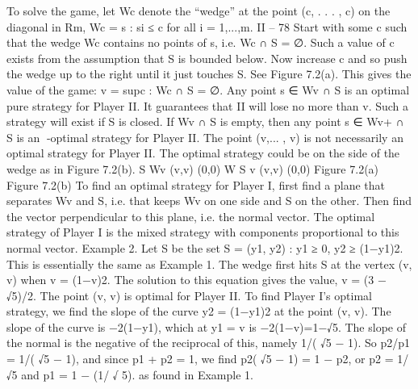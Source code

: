 \documentclass[]{report}
\begin{document}
To solve the game, let Wc denote the “wedge” at the point (c, . . . , c) on the diagonal
in Rm,
Wc = {s : si ≤ c for all i = 1,...,m}.
II – 78
Start with some c such that the wedge Wc contains no points of s, i.e. Wc ∩ S = ∅. Such
a value of c exists from the assumption that S is bounded below. Now increase c and so
push the wedge up to the right until it just touches S. See Figure 7.2(a). This gives the
value of the game:
v = sup{c : Wc ∩ S = ∅}.
Any point s ∈ Wv ∩ S is an optimal pure strategy for Player II. It guarantees that II will
lose no more than v. Such a strategy will exist if S is closed. If Wv ∩ S is empty, then
any point s ∈ Wv+ ∩ S is an -optimal strategy for Player II. The point (v,... , v) is not
necessarily an optimal strategy for Player II. The optimal strategy could be on the side of
the wedge as in Figure 7.2(b).
S
Wv
(v,v)
(0,0)
W S v
(v,v)
(0,0)
Figure 7.2(a) Figure 7.2(b)
To find an optimal strategy for Player I, first find a plane that separates Wv and S,
i.e. that keeps Wv on one side and S on the other. Then find the vector perpendicular to
this plane, i.e. the normal vector. The optimal strategy of Player I is the mixed strategy
with components proportional to this normal vector.
Example 2. Let S be the set S = {(y1, y2) : y1 ≥ 0, y2 ≥ (1−y1)2}. This is essentially
the same as Example 1. The wedge first hits S at the vertex (v, v) when v = (1−v)2. The
solution to this equation gives the value, v = (3 − √5)/2. The point (v, v) is optimal for
Player II. To find Player I’s optimal strategy, we find the slope of the curve y2 = (1−y1)2 at
the point (v, v). The slope of the curve is −2(1−y1), which at y1 = v is −2(1−v)=1−√5.
The slope of the normal is the negative of the reciprocal of this, namely 1/(
√5 − 1). So
p2/p1 = 1/(
√5 − 1), and since p1 + p2 = 1, we find p2(
√5 − 1) = 1 − p2, or p2 = 1/
√5 and
p1 = 1 − (1/
√
5). as found in Example 1.
\end{document}
